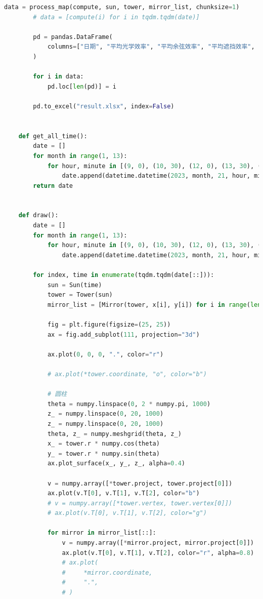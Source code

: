 \documentclass[withoutpreface,bwprint]{cumcmthesis} %
\begin{document}
\begin{appendices}
\begin{lstlisting}[language=python]
        data = process_map(compute, sun, tower, mirror_list, chunksize=1)
        # data = [compute(i) for i in tqdm.tqdm(date)]
    
        pd = pandas.DataFrame(
            columns=["日期", "平均光学效率", "平均余弦效率", "平均遮挡效率", "平均截断效率", "单位面积镜面年平均输出热功率"]
        )
    
        for i in data:
            pd.loc[len(pd)] = i
    
        pd.to_excel("result.xlsx", index=False)
    
    
    def get_all_time():
        date = []
        for month in range(1, 13):
            for hour, minute in [(9, 0), (10, 30), (12, 0), (13, 30), (15, 0)]:
                date.append(datetime.datetime(2023, month, 21, hour, minute))
        return date
    
    
    def draw():
        date = []
        for month in range(1, 13):
            for hour, minute in [(9, 0), (10, 30), (12, 0), (13, 30), (15, 0)]:
                date.append(datetime.datetime(2023, month, 21, hour, minute))
    
        for index, time in enumerate(tqdm.tqdm(date[::])):
            sun = Sun(time)
            tower = Tower(sun)
            mirror_list = [Mirror(tower, x[i], y[i]) for i in range(len(x))]
    
            fig = plt.figure(figsize=(25, 25))
            ax = fig.add_subplot(111, projection="3d")
    
            ax.plot(0, 0, 0, ".", color="r")
    
            # ax.plot(*tower.coordinate, "o", color="b")
    
            # 圆柱
            theta = numpy.linspace(0, 2 * numpy.pi, 1000)
            z_ = numpy.linspace(0, 20, 1000)
            z_ = numpy.linspace(0, 20, 1000)
            theta, z_ = numpy.meshgrid(theta, z_)
            x_ = tower.r * numpy.cos(theta)
            y_ = tower.r * numpy.sin(theta)
            ax.plot_surface(x_, y_, z_, alpha=0.4)
    
            v = numpy.array([*tower.project, tower.project[0]])
            ax.plot(v.T[0], v.T[1], v.T[2], color="b")
            # v = numpy.array([*tower.vertex, tower.vertex[0]])
            # ax.plot(v.T[0], v.T[1], v.T[2], color="g")
    
            for mirror in mirror_list[::]:
                v = numpy.array([*mirror.project, mirror.project[0]])
                ax.plot(v.T[0], v.T[1], v.T[2], color="r", alpha=0.8)
                # ax.plot(
                #     *mirror.coordinate,
                #     ".",
                # )
    

\end{lstlisting}
\end{appendices}
\end{document}
